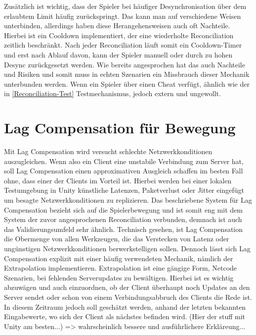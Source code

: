 \begin{enumerate}
Zusätzlich ist wichtig, dass der Spieler bei häufiger Desynchronisation über dem erlaubtem Limit häufig zurückspringt. Das kann man auf verschiedene Weisen unterbinden, allerdings haben diese Herangehensweisen auch oft Nachteile. 
Hierbei ist ein Cooldown implementiert, der eine wiederholte Reconciliation zeitlich beschränkt. Nach jeder Reconciliation läuft somit ein Cooldown-Timer und erst nach Ablauf davon, kann der Spieler manuell oder durch zu hohen Desync zurückgesetzt werden. 
Wie bereits angesprochen hat das auch Nachteile und Risiken und somit muss in echten Szenarien ein Missbrauch dieser Mechanik unterbunden werden. Wenn ein Spieler über einen Cheat verfügt, ähnlich wie der in \ref{Reconciliation-Test} Testmechanismus, jedoch extern und ungewollt.
\section{Lag Compensation für Bewegung}

Mit Lag Compensation wird versucht schlechte Netzwerkkonditionen auszugleichen. Wenn also ein Client eine unstabile Verbindung zum Server hat, soll Lag Compensation einen approximativen Ausgleich schaffen im besten Fall ohne, dass einer der Clients im Vorteil ist.
Hierbei werden bei einer lokalen Testumgebung in Unity künstliche Latenzen, Paketverlust oder Jitter eingefügt um besagte Netzwerkkonditionen zu replizieren.
Das beschriebene System für Lag Compensation bezieht sich auf die Spielerbewegung und ist somit eng mit dem System der zuvor angesprochenen Reconciliation verbunden, demnach ist auch das Validierungsumfeld sehr ähnlich.
Technisch gesehen, ist Lag Compensation die Obermenge von allen Werkzeugen, die das Verstecken von Latenz oder ungünstigen Netzwerkkonditionen berwerkstelligen sollen. 
Dennoch lässt sich Lag Compensation explizit mit einer häufig verwendeten Mechanik, nämlich der Extrapolation implementieren. Extrapolation ist eine gängige Form, Netcode Szenarien, bei fehlenden Serverupdates zu bewältigen. Hierbei ist es wichtig abzuwägen und auch einzuordnen, ob der Client überhaupt noch Updates an den Server sendet oder schon von einem Verbindungsabbruch des Clients die Rede ist.
In diesem Zeitraum jedoch soll geschätzt werden, anhand der letzten bekannten Eingabewerte, wo sich der Client als nächstes befinden wird.
(Hier der stuff mit Unity am besten...) => wahrscheinlich bessere und ausführlichere Erkläreung... 


\end{enumerate}
